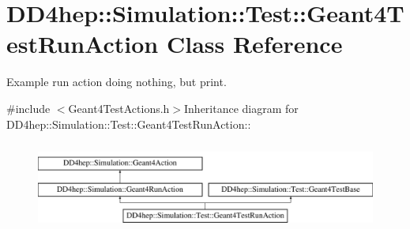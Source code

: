 \hypertarget{class_d_d4hep_1_1_simulation_1_1_test_1_1_geant4_test_run_action}{
\section{DD4hep::Simulation::Test::Geant4TestRunAction Class Reference}
\label{class_d_d4hep_1_1_simulation_1_1_test_1_1_geant4_test_run_action}
}


Example run action doing nothing, but print.  


{\ttfamily \#include $<$Geant4TestActions.h$>$}Inheritance diagram for DD4hep::Simulation::Test::Geant4TestRunAction::\begin{figure}[H]
\begin{center}
\leavevmode
\includegraphics[height=2.94737cm]{class_d_d4hep_1_1_simulation_1_1_test_1_1_geant4_test_run_action}
\end{center}
\end{figure}
